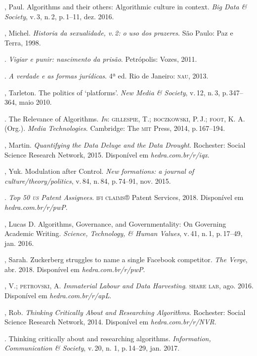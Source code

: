 \begin{bibliohedra}
, Paul. Algorithms and their others: Algorithmic culture in
context. \textit{Big Data \& Society}, v.\,3, n.\,2, p.\,1--11, dez. 2016.

, Michel. \textit{Historia da sexualidade, v.\,2: o uso dos prazeres}.
São Paulo: Paz e Terra, 1998.

\titidem. \textit{Vigiar e punir: nascimento da prisão}. Petrópolis:
Vozes, 2011.

\titidem. \textit{A verdade e as formas jurídicas}. 4ª ed. Rio de Janeiro: \textsc{nau}, 2013.

, Tarleton. The politics of `platforms'. \textit{New Media \&
Society}, v.\,12, n.\,3, p.\,347--364, maio 2010.

\titidem. The Relevance of Algorithms. \textit{In}:
\textsc{gillespie}, T.; \textsc{boczkowski}, P.\,J.; \textsc{foot}, K. A. (Org.). \textit{Media
Technologies}. Cambridge: The \textsc{mit} Press, 2014, p.\,167--194.

, Martin. \textit{Quantifying the Data Deluge and the Data Drought}.
Rochester: Social Science Research Network, 2015. Disponível em \textit{hedra.com.br/r/iqx}.

, Yuk. Modulation after Control. \textit{New formations: a journal of
culture/theory/politics}, v.\,84, n.\,84, p.\,74--91, nov. 2015.

. \textit{Top 50 \textsc{us} Patent Assignees}. \textsc{ifi claims}® Patent Services, 2018. Disponível em \textit{hedra.com.br/r/pwP}.

, Lucas D. Algorithms, Governance, and Governmentality: On
Governing Academic Writing. \textit{Science, Technology, \& Human
Values}, v.\,41, n.\,1, p.\,17--49, jan. 2016.

, Sarah. Zuckerberg struggles to name a single Facebook
competitor. \textit{The Verge}, abr. 2018. Disponível em \textit{hedra.com.br/r/pwP}.

, V.; \textsc{petrovski}, A. \textit{Immaterial Labour and Data Harvesting}.
\textsc{share lab}, ago. 2016. Disponível em \textit{hedra.com.br/r/apL}.

, Rob. \textit{Thinking Critically About and Researching
Algorithms}. Rochester: Social Science Research Network, 2014.
Disponível em \textit{hedra.com.br/r/NVR}.

\titidem. Thinking critically about and researching
algorithms. \textit{Information, Communication \& Society}, v.\,20,
n. 1, p.\,14--29, jan. 2017.


\end{bibliohedra}
